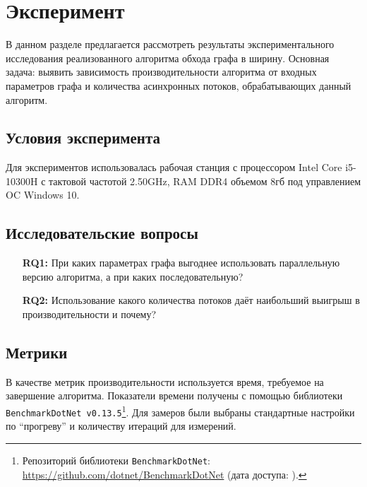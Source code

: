 
\section{Эксперимент}

В данном разделе предлагается рассмотреть результаты экспериментального исследования реализованного алгоритма обхода графа в ширину. Основная задача: выявить зависимость производительности алгоритма от входных параметров графа и количества асинхронных потоков, обрабатывающих данный алгоритм.

\subsection{Условия эксперимента}
Для экспериментов использовалась рабочая станция с процессором Intel Core i5-10300H с тактовой частотой 2.50GHz, RAM DDR4 объемом 8гб под управлением OC Windows 10.

\subsection{Исследовательские вопросы }

\begin{itemize}
\item[\textbf{RQ1:}] При каких параметрах графа выгоднее использовать параллельную версию алгоритма, а при каких последовательную?
\item[\textbf{RQ2:}] Использование какого количества потоков даёт наибольший выигрыш в производительности и почему?
\end{itemize}


\subsection{Метрики}
В качестве метрик производительности используется время, требуемое на завершение алгоритма. Показатели времени получены с помощью библиотеки \texttt{BenchmarkDotNet v0.13.5}\footnote{Репозиторий библиотеки \texttt{BenchmarkDotNet}: \url{https://github.com/dotnet/BenchmarkDotNet} (дата доступа:   ).}. Для замеров были выбраны стандартные настройки по \enquote{прогреву} и количеству итераций для измерений.

